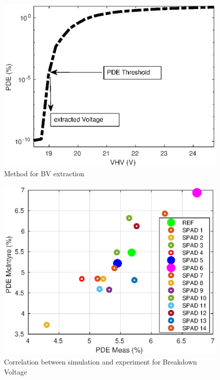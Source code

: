 \documentclass[10pt,a4paper,twocolumn]{article}
\begin{document}
\begin{figure}[h!]
\caption{Method for BV extraction}
\centering
\includegraphics[scale=0.65]{../pictures/000_McIntyre_Bench_Method.eps}
\end{figure}

\begin{figure}[h]
\caption{Correlation between simulation and experiment for Breakdown Voltage}
\centering
\includegraphics[scale=0.65]{../pictures/000_McIntyre_Bench_GR5_graphs_corel.eps}
\end{figure}
\end{document}
